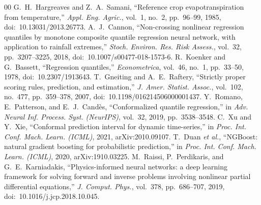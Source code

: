 \documentclass[conference]{IEEEtran}
\begin{document}
\begin{thebibliography}{00}
 G.~H.~Hargreaves and Z.~A.~Samani, ``Reference crop evapotranspiration from
temperature,'' \emph{Appl. Eng. Agric.}, vol.~1, no.~2, pp.~96--99, 1985, doi:~10.13031/2013.26773.
 A.~J.~Cannon, ``Non-crossing nonlinear regression quantiles by monotone composite
quantile regression neural network, with application to rainfall extremes,'' \emph{Stoch. Environ. Res.
Risk Assess.}, vol.~32, pp.~3207--3225, 2018, doi:~10.1007/s00477-018-1573-6.
 R.~Koenker and G.~Bassett, ``Regression quantiles,'' \emph{Econometrica}, vol.~46,
no.~1, pp.~33--50, 1978, doi:~10.2307/1913643.
 T.~Gneiting and A.~E.~Raftery, ``Strictly proper scoring rules, prediction, and
estimation,'' \emph{J. Amer. Statist. Assoc.}, vol.~102, no.~477, pp.~359--378, 2007,
doi:~10.1198/016214506000001437.
 Y.~Romano, E.~Patterson, and E.~J.~Cand\`es, ``Conformalized quantile regression,''
in \emph{Adv. Neural Inf. Process. Syst. (NeurIPS)}, vol.~32, 2019, pp.~3538--3548.
 C.~Xu and Y.~Xie, ``Conformal prediction interval for dynamic time-series,'' in
\emph{Proc. Int. Conf. Mach. Learn. (ICML)}, 2021, arXiv:2010.09107.
 T.~Duan \emph{et al.}, ``NGBoost: natural gradient boosting for probabilistic
prediction,'' in \emph{Proc. Int. Conf. Mach. Learn. (ICML)}, 2020, arXiv:1910.03225.
 M.~Raissi, P.~Perdikaris, and G.~E.~Karniadakis, ``Physics-informed neural
networks: a deep learning framework for solving forward and inverse problems involving nonlinear partial
differential equations,'' \emph{J. Comput. Phys.}, vol.~378, pp.~686--707, 2019,
doi:~10.1016/j.jcp.2018.10.045.
\end{thebibliography}
\end{document}
